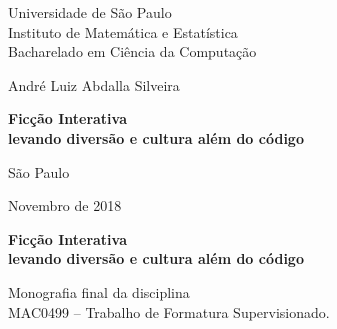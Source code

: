 \documentclass[12pt,twoside,a4paper]{book}
\begin{document}
    \frontmatter
    \fancyhead[RO]{{\footnotesize\rightmark}\hspace{2em}\thepage}
    \setcounter{tocdepth}{2}
    \fancyhead[LE]{\thepage\hspace{2em}\footnotesize{\leftmark}}
    \fancyhead[RE,LO]{}
    \fancyhead[RO]{{\footnotesize\rightmark}\hspace{2em}\thepage}

    \onehalfspacing  %


    \thispagestyle{empty}
    \begin{center}
        \vspace*{2.3cm}
        Universidade de São Paulo\\
        Instituto de Matemática e Estatística \\
        Bacharelado  em Ciência da Computação


        \vspace*{3cm}
        \Large{André Luiz Abdalla Silveira}


        \vspace{3cm}
        \textbf{\Large{Ficção Interativa \\
            levando diversão e cultura além do código}}


        \vskip 5cm
        \normalsize{São Paulo}

        \normalsize{Novembro de 2018}
    \end{center}
    \newpage
    \thispagestyle{empty}
    \begin{center}
        \vspace*{2.3 cm}
        \textbf{\Large{Ficção Interativa \\
            levando diversão e cultura além do código}}
        \vspace*{2 cm}
    \end{center}

    \vskip 2cm

    \begin{flushright}
        Monografia final da disciplina \\
        MAC0499 -- Trabalho de Formatura Supervisionado.
    \end{flushright}

    \vskip 5cm
\end{document}
